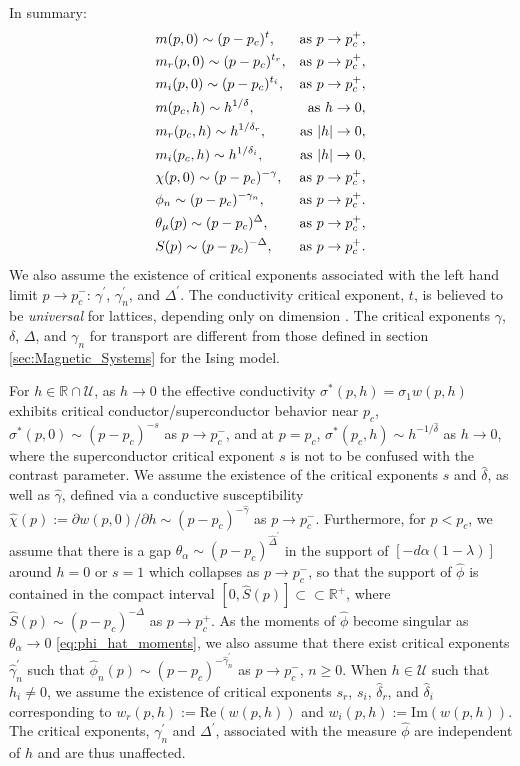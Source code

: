 \documentclass[english,12pt]{ttuthes}
\newcommand{\ph}{\hat{\phi}}
\newcommand{\gh}{\hat{\gamma}}
\newcommand{\Dh}{\hat{\Delta}}
\newcommand{\dha}{\hat{\delta}}
\begin{document}
In summary:  
%
\begin{eqnarray}\label{eq:Crit_Exponents_mh}
  &m(p,0)\sim(p-p_c)^t,  &\text{as  } p \to p_c^+,\\
  &m_r(p,0)\sim(p-p_c)^{t_r},  &\text{as  } p \to p_c^+,\notag\\
  &m_i(p,0)\sim(p-p_c)^{t_i},  &\text{as  } p \to p_c^+,\notag\\
  &m(p_c,h)\sim h^{1/ \delta },  &\text{as } h \to 0, \notag\\
  &m_r(p_c,h)\sim h^{1/ \delta_r },  &\text{as } |h| \to 0, \notag\\
  &m_i(p_c,h)\sim h^{1/ \delta_i },  &\text{as } |h| \to 0, \notag\\
  &\chi(p,0)\sim(p-p_c)^{-\gamma},  &\text{as }  p\to p_c^+,\notag\\
  &\phi_n\sim(p-p_c)^{-\gamma_n},  &\text{as }  p\to p_c^+. \notag\\
  &\theta_\mu(p)\sim(p-p_c)^\Delta,  &\text{as }  p\to p_c^+,\notag\\
  &S(p)\sim(p-p_c)^{-\Delta},  &\text{as } p \to p_c^+.\notag
\end{eqnarray} 
%
We also assume the existence of critical exponents associated with the
left hand limit $p\to p_c^-$: $\gamma^\prime$, $\gamma^\prime_n$, and $\Delta^\prime$. The
conductivity critical exponent, $t$, is believed to be
\emph{universal} for lattices, depending only on dimension
\cite{Golden:PRL-3935}. The critical exponents $\gamma$, $\delta$, $\Delta$, and
$\gamma_n$ for transport are different from those defined in section
\ref{sec:Magnetic_Systems} for the Ising model.

For $h\in\mathbb{R}\cap\mathcal{U}$, as $h\to0$ the effective conductivity
$\sigma^*(p,h)=\sigma_1w(p,h)$ exhibits critical conductor/superconductor
behavior near $p_c$, $\sigma^*(p,0)\sim(p-p_c)^{-s}$ as $p\to p_c^-$, and at
$p=p_c$, $\sigma^*(p_c,h)\sim h^{-1/\dha}$ as $h\to0$, where the superconductor
critical exponent $s$ is not to be confused with the contrast
parameter. We assume the existence of the critical exponents $s$ and
$\dha$, as well as $\gh$, defined via a conductive susceptibility
$\hat{\chi}(p):=\partial w(p,0)/\partial h\sim(p-p_c)^{-\gh}$ as $p\to p_c^-$. Furthermore,
for $p<p_c$, we assume that there is a gap $\theta_\alpha\sim(p-p_c)^{\Dh^\prime}$ in the
support of $[-d\alpha(1-\lambda)]$ around $h=0$ or $s=1$ which collapses as
$p\to p_c^-$, so that the support of $\ph$ is contained in the compact
interval $[0,\hat{S}(p)]\subset\subset\mathbb{R}^+$, where
$\hat{S}(p)\sim(p-p_c)^{-\Delta}$ as $p\to p_c^+$. As the moments of $\ph$ become
singular as $\theta_\alpha\to0$ \eqref{eq:phi_hat_moments}, we also assume that
there exist critical exponents $\gh_n^\prime$ such that
$\ph_n(p)\sim(p-p_c)^{-\gh_n^\prime}$ as $p\to p_c^-$, $n\geq0$. When
$h\in\mathcal{U}$ such that $h_i\neq0$, we assume the existence of critical
exponents $s_r$, $s_i$, $\dha_r$, and $\dha_i$ corresponding to
$w_r(p,h):=\text{Re}(w(p,h))$ and $w_i(p,h):=\text{Im}(w(p,h))$. The
critical exponents, $\gamma_n^\prime$ and $\Delta^\prime$, associated with the measure
$\ph$ are independent of $h$ and are thus unaffected.
\end{document}
